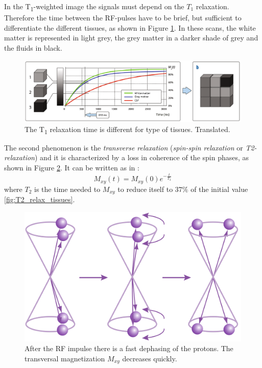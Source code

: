  \noindent In the T\textsubscript{1}-weighted image the signals must depend on the $T_1$ relaxation. Therefore the time between the RF-pulses have to be brief, but sufficient to differentiate the different tissues, as shown in Figure \ref{fig:T1_relax_tissues}. In these scans, the white matter is represented in light grey, the grey matter in a darker shade of grey and the fluids in black.

 \begin{figure}[h]
    \centering
    \includegraphics[width=1\textwidth]{images/t1_relax_tissues.png}
    \caption{The T\textsubscript{1} relaxation time is different for type of tissues. \cite{elementiRisonanza} Translated.}
    \label{fig:T1_relax_tissues}
 \end{figure}
 The second phenomenon is the \emph{transverse relaxation} (\emph{spin-spin relaxation} or \emph{T2-relaxation}) and it is characterized by a loss in coherence of the spin phases, as shown in Figure \ref{fig:T2_relax_phases}. It can be written as in \cite{slides}:
 \begin{equation}
    M_{xy}(t)=M_{xy}(0)e^{-\frac{t}{T_{2}}}
 \end{equation}
 where $T_2$ is the time needed to $M_{xy}$ to reduce itself to $37\%$ of the initial value \ref{fig:T2_relax_tissues}.

 \begin{figure}[h]
   \centering
   \begin{minipage}[c]{0.5\textwidth}
      \includegraphics[width=1\textwidth]{images/t2_relax_phases.png}
   \end{minipage}\hfill
   \begin{minipage}[b]{0.45\textwidth}
      \caption{After the RF impulse there is a fast dephasing of the protons. The transversal magnetization $M_{xy}$ decreases quickly. \cite{KastlerVetterIRM} }
      \label{fig:T2_relax_phases}
   \end{minipage}
\end{figure}
 
